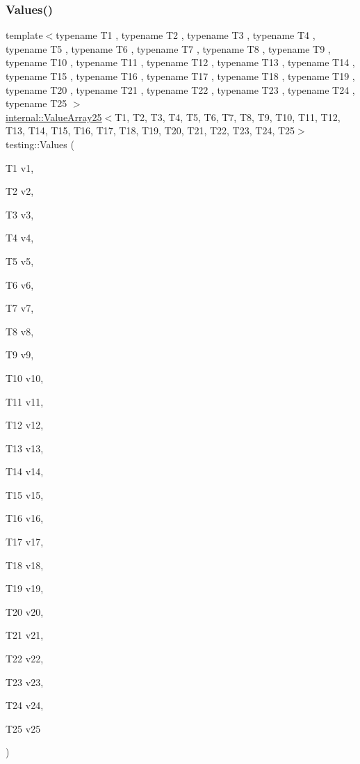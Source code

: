 \subsubsection{\texorpdfstring{Values()}{Values()}\hspace{0.1cm}{\footnotesize\ttfamily [26/51]}}
{\footnotesize\ttfamily template$<$typename T1 , typename T2 , typename T3 , typename T4 , typename T5 , typename T6 , typename T7 , typename T8 , typename T9 , typename T10 , typename T11 , typename T12 , typename T13 , typename T14 , typename T15 , typename T16 , typename T17 , typename T18 , typename T19 , typename T20 , typename T21 , typename T22 , typename T23 , typename T24 , typename T25 $>$ \\
\mbox{\hyperlink{classtesting_1_1internal_1_1_value_array25}{internal\+::\+Value\+Array25}}$<$T1, T2, T3, T4, T5, T6, T7, T8, T9, T10, T11, T12, T13, T14, T15, T16, T17, T18, T19, T20, T21, T22, T23, T24, T25$>$ testing\+::\+Values (\begin{DoxyParamCaption}\item[{T1}]{v1,  }\item[{T2}]{v2,  }\item[{T3}]{v3,  }\item[{T4}]{v4,  }\item[{T5}]{v5,  }\item[{T6}]{v6,  }\item[{T7}]{v7,  }\item[{T8}]{v8,  }\item[{T9}]{v9,  }\item[{T10}]{v10,  }\item[{T11}]{v11,  }\item[{T12}]{v12,  }\item[{T13}]{v13,  }\item[{T14}]{v14,  }\item[{T15}]{v15,  }\item[{T16}]{v16,  }\item[{T17}]{v17,  }\item[{T18}]{v18,  }\item[{T19}]{v19,  }\item[{T20}]{v20,  }\item[{T21}]{v21,  }\item[{T22}]{v22,  }\item[{T23}]{v23,  }\item[{T24}]{v24,  }\item[{T25}]{v25 }\end{DoxyParamCaption})}

